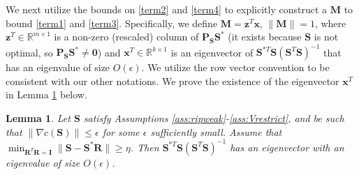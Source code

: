 \documentclass[twoside,11pt]{article}
\newcommand{\md}[1]{\mathbb{#1}}
\newtheorem{lem}{Lemma}
\begin{document}
We next  utilize the bounds on   \ref{term2} and \ref{term4}
to explicitly construct a $\bm{M}$ to bound \ref{term1} and \ref{term3}. Specifically, we define $\bm{M}=\bm{z}^T\bm{x}$, $\|\bm{M}\|=1$,  where $\bm{z}^T \in \md{R}^{m \times 1}$ is a non-zero (rescaled) column of $\bm{P}_{\bm{S}}\bm{S}^*$ (it exists because $\bm{S}$ is not optimal, so $\bm{P}_{\bm{S}}\bm{S}^*\neq \bm{0}$) and $\bm{x}^T \in \md{R}^{k \times 1}$ is an eigenvector of $\bm{S}^{*T}\bm{S}(\bm{S}^T\bm{S})^{-1}$ that has an eigenvalue of size $O(\epsilon)$. We utilize the row vector convention to be consistent with our other notations. We prove the existence of the eigenvector $\bm{x}^T$ in Lemma \ref{lem:eigvec_existence} below.
\begin{lem}
	\label{lem:eigvec_existence}
	Let $\bm{S}$ satisfy Assumptions \ref{ass:ripweak}-\ref{ass:Vrestrict}, and be such that $\|\nabla c(\bm{S})\|\leq \epsilon$ for some $\epsilon$ sufficiently small. Assume that $\min_{\bm{R}^T\bm{R}=\bm{I}}\|\bm{S}-\bm{S}^*\bm{R}\|\geq \eta$. Then $\bm{S}^{*T}\bm{S}(\bm{S}^T\bm{S})^{-1}$ has an eigenvector with an eigenvalue of size $O(\epsilon)$.
\end{lem}
\end{document}
